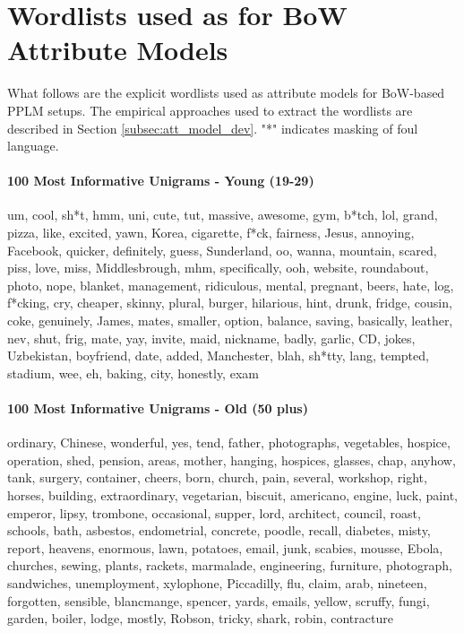 \newpage
\section{Wordlists used as for BoW Attribute Models}
\label{sec:wordlists}

What follows are the explicit wordlists used as attribute models for BoW-based PPLM setups. The empirical approaches used to extract the wordlists are described in Section \ref{subsec:att_model_dev}. "*" indicates masking of foul language.


\paragraph{100 Most Informative Unigrams - Young (19-29)} um, cool, sh*t, hmm, uni, cute, tut, massive, awesome, gym, b*tch, lol, grand, pizza, like, excited, yawn, Korea, cigarette, f*ck, fairness, Jesus, annoying, Facebook, quicker, definitely, guess, Sunderland, oo, wanna, mountain, scared, piss, love, miss, Middlesbrough, mhm, specifically, ooh, website, roundabout, photo, nope, blanket, management, ridiculous, mental, pregnant, beers, hate, log, f*cking, cry, cheaper, skinny, plural, burger, hilarious, hint, drunk, fridge, cousin, coke, genuinely, James, mates, smaller, option, balance, saving, basically, leather, nev, shut, frig, mate, yay, invite, maid, nickname, badly, garlic, CD, jokes, Uzbekistan, boyfriend, date, added, Manchester, blah, sh*tty, lang, tempted, stadium, wee, eh, baking, city, honestly, exam

\paragraph{100 Most Informative Unigrams - Old (50 plus)} ordinary, Chinese, wonderful, yes, tend, father, photographs, vegetables, hospice, operation, shed, pension, areas, mother, hanging, hospices, glasses, chap, anyhow, tank, surgery, container, cheers, born, church, pain, several, workshop, right, horses, building, extraordinary, vegetarian, biscuit, americano, engine, luck, paint, emperor, lipsy, trombone, occasional, supper, lord, architect, council, roast, schools, bath, asbestos, endometrial, concrete, poodle, recall, diabetes, misty, report, heavens, enormous, lawn, potatoes, email, junk, scabies, mousse, Ebola, churches, sewing, plants, rackets, marmalade, engineering, furniture, photograph, sandwiches, unemployment, xylophone, Piccadilly, flu, claim, arab, nineteen, forgotten, sensible, blancmange, spencer, yards, emails, yellow, scruffy, fungi, garden, boiler, lodge, mostly, Robson, tricky, shark, robin, contracture

